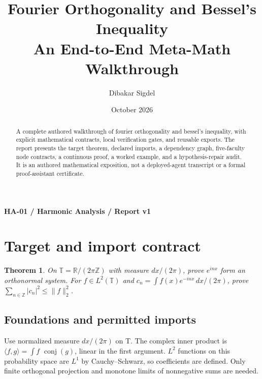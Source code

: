 \documentclass[preprint,12pt,aps,pra,showkeys,amsmath,amssymb,superscriptaddress,floatfix]{revtex4-2}
\newtheorem{theorem}{Theorem}[section]
\theoremstyle{definition}
\theoremstyle{remark}
\begin{document}
\title{Fourier Orthogonality and Bessel's Inequality\\[4pt]\large An End-to-End Meta-Math Walkthrough}

\author{Dibakar Sigdel}


\date{October 2026}

\begin{abstract}

A complete authored walkthrough of fourier orthogonality and bessel's
inequality, with explicit mathematical contracts, local verification
gates, and reusable exports. The report presents the target theorem,
declared imports, a dependency graph, five-faculty node contracts, a
continuous proof, a worked example, and a hypothesis-repair audit. It is
an authored mathematical exposition, not a deployed-agent transcript or
a formal proof-assistant certificate.

\end{abstract}\maketitle\linespread{1.12}\selectfont

\noindent\textbf{HA-01 / Harmonic Analysis / Report v1}

\section{Target and import contract}

\begin{theorem}

On \(\mathbb T=\mathbb R/(2\pi\mathbb Z)\) with measure \(dx/(2\pi)\),
prove \(e^{inx}\) form an orthonormal system. For
\(f\in L^2(\mathbb T)\) and \(c_n=\int f(x)e^{-inx}\,dx/(2\pi)\), prove
\(\sum_{n\in\mathbb Z}|c_n|^2\le\|f\|_2^2\).

\end{theorem}

\subsection{Foundations and permitted imports}

Use normalized measure \(dx/(2\pi )\) on T. The complex inner product is
\(\langle f,g\rangle =\int f\) \(\operatorname{conj} (g)\), linear in
the first argument. \(L^{2}\) functions on this probability space are
\(L^{1}\) by Cauchy--Schwarz, so coefficients are defined. Only finite
orthogonal projection and monotone limits of nonnegative sums are
needed.
\end{document}
